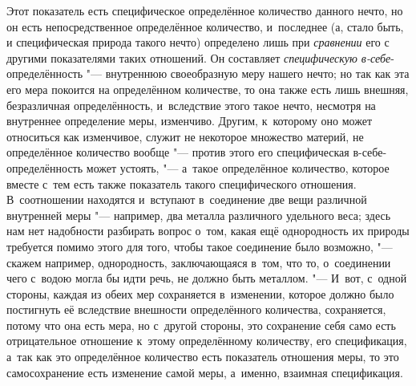 Этот показатель есть специфическое определённое количество данного нечто, но он
есть непосредственное определённое количество, и~последнее (а, стало быть, и
специфическая природа такого нечто) определено лишь при {\em сравнении} его с
другими показателями таких отношений. Он составляет {\em специфическую
в-себе}-определённость "--- внутреннюю своеобразную меру нашего нечто; но так
как эта его мера покоится на определённом количестве, то она также есть лишь
внешняя, безразличная определённость, и~вследствие этого такое нечто, несмотря
на внутреннее определение меры, изменчиво. Другим, к~которому оно может
относиться как изменчивое, служит не некоторое множество материй, не
определённое количество вообще "--- против этого его специфическая
в-себе-определённость может устоять, "--- а~такое определённое количество,
которое вместе с~тем есть также показатель такого специфического отношения.
В~соотношении находятся и~вступают в~соединение две вещи различной внутренней
меры "--- например, два металла различного удельного веса; здесь нам нет
надобности разбирать вопрос о~том, какая ещё однородность их природы требуется
помимо этого для того, чтобы такое соединение было возможно, "--- скажем
например, однородность, заключающаяся в~том, что то, о~соединении чего с~водою
могла бы идти речь, не должно быть металлом. "--- И~вот, с~одной стороны,
каждая из обеих мер сохраняется в~изменении, которое должно было постигнуть её
вследствие внешности определённого количества, сохраняется, потому что она есть
мера, но с~другой стороны, это сохранение себя само есть отрицательное
отношение к~этому определённому количеству, его спецификация, а~так как это
определённое количество есть показатель отношения меры, то это самосохранение
есть изменение самой меры, а~именно, взаимная спецификация.

